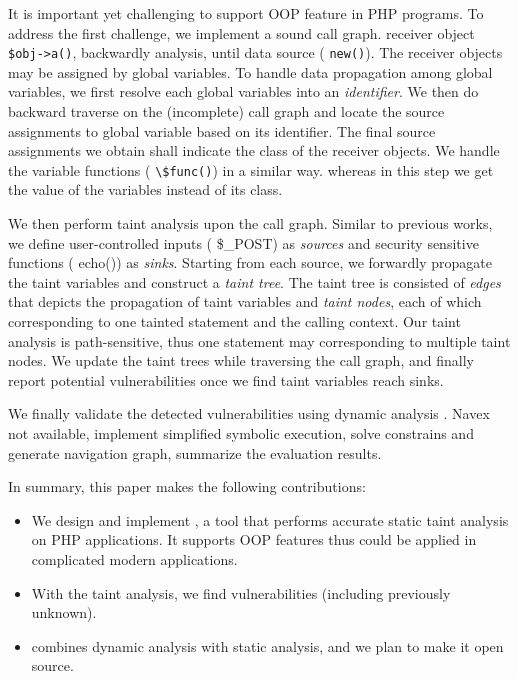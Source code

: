 It is important yet challenging to support OOP feature in PHP programs.
To address the first challenge, we implement a sound call graph.
receiver object {\ie{,} \lstinline{$obj->a()}}, backwardly analysis, until data source (\eg{,} \lstinline{new()}).
The receiver objects may be assigned by global variables.
To handle data propagation among global variables, we first resolve each global variables into an \emph{identifier}.
We then do backward traverse on the (incomplete) call graph and locate the source assignments to global variable based on its identifier.
The final source assignments we obtain shall indicate the class of the receiver objects.
We handle the variable functions (\ie{,} \lstinline{\$func()}) in a similar way.
whereas in this step we get the value of the variables instead of its class.

We then perform taint analysis upon the call graph.
Similar to previous works, we define user-controlled inputs (\eg{,} \$_POST) as \emph{sources} and security sensitive functions (\eg{,} echo()) as \emph{sinks}.
Starting from each source, we forwardly propagate the taint variables and construct a \emph{taint tree}.
The taint tree is consisted of \emph{edges} that depicts the propagation of taint variables and \emph{taint nodes}, each of which corresponding to one tainted statement and the calling context.
Our taint analysis is path-sensitive, thus one statement may corresponding to multiple taint nodes.
We update the taint trees while traversing the call graph, and finally report potential vulnerabilities once we find taint variables reach sinks.

We finally validate the detected vulnerabilities using dynamic analysis \citep{navex}.
Navex not available, implement simplified symbolic execution, solve constrains and generate navigation graph, summarize the evaluation results. 

In summary, this paper makes the following contributions:
\begin{itemize}%
    \item We design and implement \sys, a tool that performs accurate static taint analysis on PHP applications. It supports OOP features thus could be applied in complicated modern applications.
    \item With the taint analysis, we find \XXX{} vulnerabilities (including \XXX{} previously unknown).
    \item \sys combines dynamic analysis with static analysis, and we plan to make it open source.
\end{itemize}













